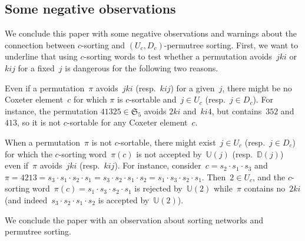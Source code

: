 \documentclass[ALCO]{cedram}
\newcommand{\fS}{\mathfrak{S}}
\newcommand{\automatonU}{\mathbb{U}}
\newcommand{\automatonD}{\mathbb{D}}
\begin{document}
\subsection{Some negative observations}

We conclude this paper with some negative observations and warnings about the connection between $c$-sorting and $(U_c,D_c)$-permutree sorting.
First, we want to underline that using $c$-sorting words to test whether a permutation avoids~$jki$ or $kij$ for a fixed~$j$ is dangerous for the following two reasons.

\begin{remark}
Even if a permutation~$\pi$ avoids~$jki$ (resp.~$kij$) for a given~$j$, there might be no Coxeter element~$c$ for which $\pi$ is $c$-sortable and~$j \in U_c$ (resp.~$j \in D_c$).
For instance, the permutation $41325 \in \fS_5$ avoids $2ki$ and~$ki4$, but contains~$352$ and~$413$, so it is not $c$-sortable for any Coxeter element~$c$.
\end{remark}

\begin{remark}
When a permutation~$\pi$ is not $c$-sortable, there might exist~$j \in U_c$ (resp.~$j \in D_c$) for which the $c$-sorting word~$\pi(c)$ is not accepted by~$\automatonU(j)$ (resp.~$\automatonD(j)$) even if~$\pi$ avoids~$jki$ (resp.~$kij$).
For instance, consider~$c = s_2 \cdot s_1 \cdot s_3$ and ${\pi = 4213 = s_3 \cdot s_1 \cdot s_2 \cdot s_1 =  s_3 \cdot s_2 \cdot s_1 \cdot s_2 =  s_1 \cdot s_3 \cdot s_2 \cdot s_1}$.
Then~$2 \in U_c$, and the $c$-sorting word~$\pi(c) = s_1 \cdot s_3 \cdot s_2 \cdot s_1$ is rejected by~$\automatonU(2)$ while~$\pi$ contains no~$2ki$ (and indeed~$s_3 \cdot s_2 \cdot s_1 \cdot s_2$ is accepted by~$\automatonU(2)$).
\end{remark}

We conclude the paper with an observation about sorting networks and permutree sorting.
\end{document}
